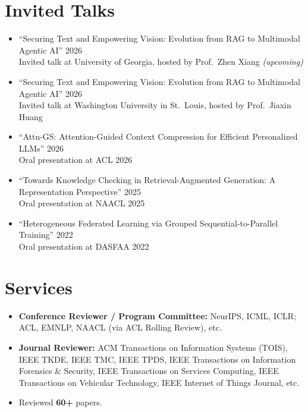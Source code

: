 \documentclass[11pt,a4paper,roman]{moderncv}        %
\begin{document}
\section{Invited Talks}
\begin{minipage}{\maincolumnwidth}%
	\small{
    	\begin{itemize}
        			\item{``Securing Text and Empowering Vision: Evolution from RAG to Multimodal Agentic AI'' \hfill 2026 \\ Invited talk at University of Georgia, hosted by Prof.\ Zhen Xiang \emph{(upcoming)}}
        			\item{``Securing Text and Empowering Vision: Evolution from RAG to Multimodal Agentic AI'' \hfill 2026 \\ Invited talk at Washington University in St.\ Louis, hosted by Prof.\ Jiaxin Huang}
        			\item{``Attn-GS: Attention-Guided Context Compression for Efficient Personalized LLMs'' \hfill 2026 \\ Oral presentation at ACL 2026}
        			\item{``Towards Knowledge Checking in Retrieval-Augmented Generation: A Representation Perspective'' \hfill 2025 \\ Oral presentation at NAACL 2025}
        			\item{``Heterogeneous Federated Learning via Grouped Sequential-to-Parallel Training'' \hfill 2022 \\ Oral presentation at DASFAA 2022}
		\end{itemize}}%
\end{minipage}%

\section{Services}
\begin{minipage}{\maincolumnwidth}%
	\small{
    	\begin{itemize}
        			\item{\textbf{Conference Reviewer / Program Committee:} NeurIPS, ICML, ICLR; ACL, EMNLP, NAACL (via ACL Rolling Review), etc.}
           \item{\textbf{Journal Reviewer:} ACM Transactions on Information Systems (TOIS), IEEE TKDE, IEEE TMC, IEEE TPDS, IEEE Transactions on Information Forensics \& Security, IEEE Transactions on Services Computing, IEEE Transactions on Vehicular Technology, IEEE Internet of Things Journal, etc.}
           \item Reviewed \textbf{60+} papers.
        
        
          
        
		\end{itemize}}%
\end{minipage}%
\end{document}

